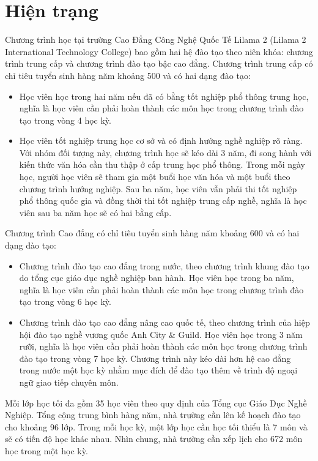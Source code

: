 \documentclass[11pt]{article}
\begin{document}
\section{\texorpdfstring{Hiện trạng}{Context}}


Chương trình học tại trường Cao Đẳng Công Nghệ Quốc Tế Lilama 2 (Lilama 2 International Technology College) bao gồm hai hệ đào tạo theo niên khóa: chương trình trung cấp và chương trình đào tạo bậc cao đẳng. 
Chương trình trung cấp có chỉ tiêu tuyển sinh hàng năm khoảng 500 và có hai dạng đào tạo: 

\begin{itemize}
\item	Học viên học trong hai năm nếu đã có bằng tốt nghiệp phổ thông trung học, nghĩa là học viên cần phải hoàn thành các môn học trong chương trình đào tạo trong vòng 4 học kỳ.
\item	Học viên tốt nghiệp trung học cơ sở và có định hướng nghề nghiệp rõ ràng. Với nhóm đối tượng này, chương trình học sẽ kéo dài 3 năm, đi song hành với kiến thức văn hóa cần thu thập ở cấp trung học phổ thông. Trong mỗi ngày học, người học viên sẽ tham gia một buổi học văn hóa và một buổi theo chương trình hướng nghiệp. Sau ba năm, học viên vẫn phải thi tốt nghiệp phổ thông quốc gia và đồng thời thi tốt nghiệp trung cấp nghề, nghĩa là học viên sau ba năm học sẽ có hai bằng cấp.
\end{itemize}

Chương trình Cao đẳng có chỉ tiêu tuyển sinh hàng năm khoảng 600 và có hai dạng đào tạo:

\begin{itemize}
\item	Chương trình đào tạo cao đẳng trong nước, theo chương trình khung đào tạo do tổng cục giáo dục nghề nghiệp ban hành. Học viên học trong ba năm, nghĩa là học viên cần phải hoàn thành các môn học trong chương trình đào tạo trong vòng 6 học kỳ.
\item	Chương trình đào tạo cao đẳng nâng cao quốc tế, theo chương  trình của hiệp hội đào tạo nghề vương quốc Anh City \& Guild. Học viên học trong 3 năm rưỡi, nghĩa là học viên cần phải hoàn thành các môn học trong chương trình đào tạo trong vòng 7 học kỳ. Chương trình này kéo dài hơn hệ cao đẳng trong nước một học kỳ nhằm mục đích để đào tạo thêm về trình độ ngoại ngữ giao tiếp chuyên môn.
\end{itemize}

Mỗi lớp học tối đa gồm 35 học viên theo quy định của Tổng cục Giáo Dục Nghề Nghiệp. Tổng cộng trung bình hàng năm, nhà trường cần lên kế hoạch đào tạo cho khoảng 96 lớp. Trong mỗi học kỳ, một lớp học cần học tối thiểu là 7 môn và sẽ có tiến độ học khác nhau. Nhìn chung, nhà trường cần xếp lịch cho 672 môn học trong một học kỳ.
\end{document}
